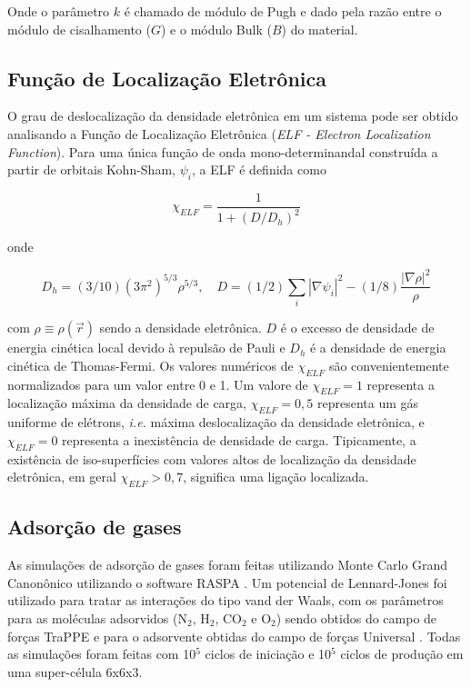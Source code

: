 		Onde o parâmetro $k$ é chamado de módulo de Pugh e dado pela razão entre o módulo de cisalhamento ($G$) e o módulo Bulk ($B$) do material.
	
	\subsection{Função de Localização Eletrônica}
	
		O grau de deslocalização da densidade eletrônica em um sistema pode ser obtido analisando a Função de Localização Eletrônica (\textit{ELF - Electron Localization Function}). \cite{savin1992electron} Para uma única função de onda mono-determinandal construída a partir de orbitais Kohn-Sham, $\psi_i$, a ELF é definida como
		
		\begin{equation}
		\chi_{ELF} = \frac{1}{1 + (D/D_h)^2}
		\end{equation}
		
		onde 
		
		\begin{equation}
		D_h = (3/10)(3\pi^2)^{5/3}\rho^{5/3}, \quad D = (1/2)\sum_i|\nabla\psi_i|^2 - (1/8)\frac{|\nabla\rho|^2}{\rho}
		\end{equation}
		
		com $\rho \equiv \rho(\vec{r})$ sendo a densidade eletrônica. $D$ é o excesso de densidade de energia cinética local devido à repulsão de Pauli e $D_h$ é a densidade de energia cinética de Thomas-Fermi. Os valores numéricos de $\chi_{ELF}$ são convenientemente normalizados para um valor entre 0 e 1. Um valore de $\chi_{ELF}=1$ representa a localização máxima da densidade de carga, $\chi_{ELF}=0,5$ representa um gás uniforme de elétrons, \textit{i.e.} máxima deslocalização da densidade eletrônica, e  $\chi_{ELF}=0$ representa a inexistência de densidade de carga. Tipicamente, a existência de iso-superfícies com valores altos de localização da densidade eletrônica, em geral $\chi_{ELF}>0,7$, significa uma ligação localizada.   
		
	\subsection{Adsorção de gases}
		
		As simulações de adsorção de gases foram feitas utilizando Monte Carlo Grand Canonônico utilizando o software RASPA \cite{dubbeldam2016raspa}. Um potencial de Lennard-Jones foi utilizado para tratar as interações do tipo vand der Waals, com os parâmetros para as moléculas adsorvidos (N$_2$, H$_2$, CO$_2$ e O$_2$) sendo obtidos do campo de forças TraPPE \cite{potoff2001vapor} e para o adsorvente obtidas do campo de forças Universal \cite{casewit1992application}. Todas as simulações foram feitas com 10$^5$ ciclos de iniciação e 10$^5$ ciclos de produção em uma super-célula 6x6x3.
		
